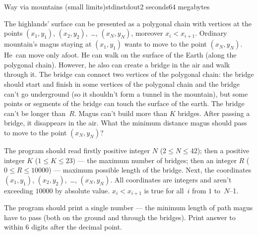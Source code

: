 \begin{problem}{Way via mountains (small limits)}{stdin}{stdout}{2 seconds}{64 megabytes}

The highlands' surface can be presented as a polygonal chain with vertices at the points $(x_1,y_1)$, $(x_2,y_2)$,~\dots, $(x_N,y_N)$, moreover $x_i<x_{i+1}$.
Ordinary mountain's magus staying at $(x_1,y_1)$ wants to move to the point $(x_N,y_N)$. He~can move only afoot. He can walk on the surface of the Earth (along the polygonal chain). However, he also can create a bridge in the air and walk through it. The bridge can connect two vertices of the polygonal chain: the bridge should start and finish in some vertices of the polygonal chain and the bridge can't go underground (so it shouldn't form a tunnel in the mountain), but some points or segments of the bridge can touch the surface of the earth.
The bridge can't be longer than~$R$. Magus can't build more than $K$ bridges. After passing a bridge, it disappears in the air. What the minimum distance magus should pass to move to the point $(x_N,y_N)$?

\InputFile
The program should read firstly positive integer $N$ ($2\leq N\leq 42$);
then a positive integer $K$ ($1\leq K\leq 23$) ---
the maximum number of bridges;
then an integer $R$ ($0\leq R\leq 10000$) --- maximum
possible length of the bridge. Next, the coordinates $(x_1,y_1)$, $(x_2,y_2)$,~\dots, $(x_N,y_N)$.
All coordinates are integers and aren't exceeding $10000$ by absolute value.
$x_i<x_{i+1}$ is true for all~$i$ from $1$ to~$N$--1.

\OutputFile
The program should print a single number --- the minimum length of path magus have to pass (both on the ground and through the bridges).
Print answer to within 6 digits after the decimal point.

\Examples

\begin{example}
%
\end{example}

\end{problem}
